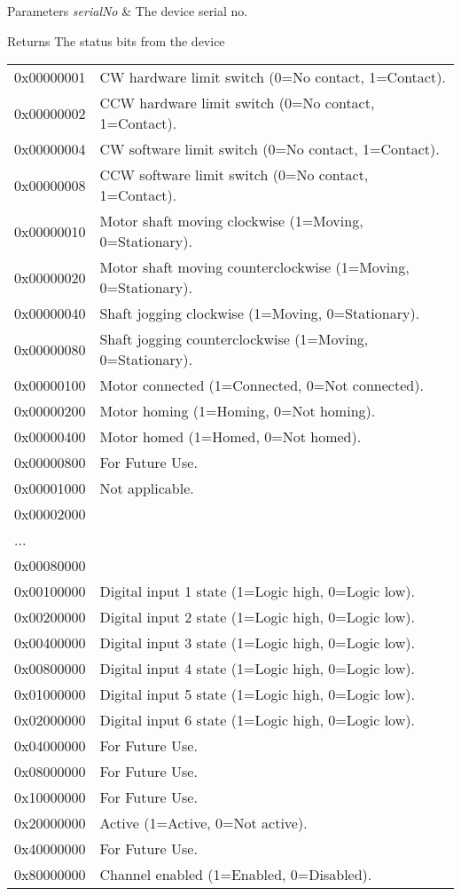 \begin{DoxyParams}{Parameters}
{\em serial\+No} & The device serial no. \\
\hline
\end{DoxyParams}
\begin{DoxyReturn}{Returns}
The status bits from the device \tabulinesep=1mm
\begin{longtabu} spread 0pt [c]{*2{|X[-1]}|}
\hline
0x00000001&CW hardware limit switch (0=No contact, 1=Contact). \\
0x00000002&C\+CW hardware limit switch (0=No contact, 1=Contact). \\
0x00000004&CW software limit switch (0=No contact, 1=Contact). \\
0x00000008&C\+CW software limit switch (0=No contact, 1=Contact). \\
0x00000010&Motor shaft moving clockwise (1=Moving, 0=Stationary). \\
0x00000020&Motor shaft moving counterclockwise (1=Moving, 0=Stationary). \\
0x00000040&Shaft jogging clockwise (1=Moving, 0=Stationary). \\
0x00000080&Shaft jogging counterclockwise (1=Moving, 0=Stationary). \\
0x00000100&Motor connected (1=Connected, 0=Not connected). \\
0x00000200&Motor homing (1=Homing, 0=Not homing). \\
0x00000400&Motor homed (1=Homed, 0=Not homed). \\
0x00000800&For Future Use. \\
0x00001000&Not applicable. \\
0x00002000&\\
...&\\
0x00080000&\\
0x00100000&Digital input 1 state (1=Logic high, 0=Logic low). \\
0x00200000&Digital input 2 state (1=Logic high, 0=Logic low). \\
0x00400000&Digital input 3 state (1=Logic high, 0=Logic low). \\
0x00800000&Digital input 4 state (1=Logic high, 0=Logic low). \\
0x01000000&Digital input 5 state (1=Logic high, 0=Logic low). \\
0x02000000&Digital input 6 state (1=Logic high, 0=Logic low). \\
0x04000000&For Future Use. \\
0x08000000&For Future Use. \\
0x10000000&For Future Use. \\
0x20000000&Active (1=Active, 0=Not active). \\
0x40000000&For Future Use. \\
0x80000000&Channel enabled (1=Enabled, 0=Disabled). \\
\end{longtabu}



\end{DoxyReturn}
